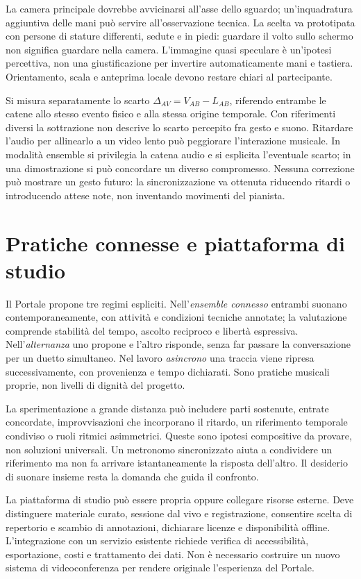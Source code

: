 La camera principale dovrebbe avvicinarsi all'asse dello sguardo;
un'inquadratura aggiuntiva delle mani può servire all'osservazione
tecnica. La scelta va prototipata con persone di stature differenti,
sedute e in piedi: guardare il volto sullo schermo non significa
guardare nella camera. L'immagine quasi speculare è un'ipotesi
percettiva, non una giustificazione per invertire automaticamente
mani e tastiera. Orientamento, scala e anteprima locale devono
restare chiari al partecipante.

Si misura separatamente lo scarto $\Delta_{AV}=V_{AB}-L_{AB}$,
riferendo entrambe le catene allo stesso evento fisico e alla stessa
origine temporale. Con riferimenti diversi la sottrazione non descrive
lo scarto percepito fra gesto e suono.
Ritardare l'audio per allinearlo a un video lento può peggiorare
l'interazione musicale. In modalità ensemble si privilegia la
catena audio e si esplicita l'eventuale scarto; in una dimostrazione
si può concordare un diverso compromesso. Nessuna correzione
può mostrare un gesto futuro: la sincronizzazione va ottenuta
riducendo ritardi o introducendo attese note, non inventando
movimenti del pianista.

\section{Pratiche connesse e piattaforma di studio}

Il Portale propone tre regimi espliciti. Nell'\emph{ensemble
connesso} entrambi suonano contemporaneamente, con attività e
condizioni tecniche annotate; la valutazione comprende stabilità
del tempo, ascolto reciproco e libertà espressiva. Nell'\emph{alternanza}
uno propone e l'altro risponde, senza far passare la conversazione
per un duetto simultaneo. Nel lavoro \emph{asincrono} una traccia
viene ripresa successivamente, con provenienza e tempo dichiarati.
Sono pratiche musicali proprie, non livelli di dignità del progetto.

La sperimentazione a grande distanza può includere parti sostenute,
entrate concordate, improvvisazioni che incorporano il ritardo,
un riferimento temporale condiviso o ruoli ritmici asimmetrici.
Queste sono ipotesi compositive da provare, non soluzioni universali.
Un metronomo sincronizzato aiuta a condividere un riferimento ma
non fa arrivare istantaneamente la risposta dell'altro. Il desiderio
di suonare insieme resta la domanda che guida il confronto.

La piattaforma di studio può essere propria oppure collegare
risorse esterne. Deve distinguere materiale curato, sessione dal
vivo e registrazione, consentire scelta di repertorio e scambio
di annotazioni, dichiarare licenze e disponibilità offline.
L'integrazione con un servizio esistente richiede verifica di
accessibilità, esportazione, costi e trattamento dei dati. Non è
necessario costruire un nuovo sistema di videoconferenza per
rendere originale l'esperienza del Portale.

